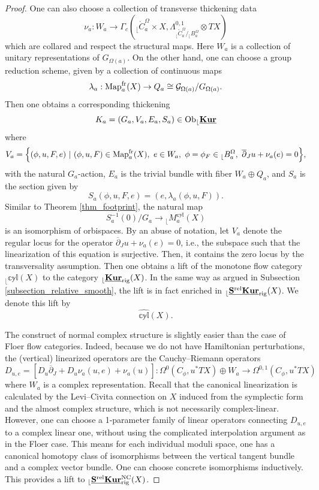 \documentclass[reqno, 10pt]{amsart}
\numberwithin{equation}{section}
\numberwithin{equation}{section}
\theoremstyle{definition}
\theoremstyle{remark}
\newcommand{\beqn}{\begin{equation*}}
\newcommand{\eeqn}{\end{equation*}}
\newcommand{\ov}{\overline}
\newcommand{\mb}{\mathbb}
\newcommand{\mc}{\mathcal}
\renewcommand{\outer}{{}_{\lfloor}}
\newcommand{\uds}[1]{\underline{\smash{#1}}}
\begin{document}
\begin{proof}
One can also choose a collection of transverse thickening data
\beqn
\nu_a: W_a \to \Gamma_c( \outer \mathring C_a^\Omega \times X, \Lambda_{\outer \mathring C_a^\Omega/ \outer B_a^\Omega}^{0,1}\otimes TX)
\eeqn
which are collared and respect the structural maps. Here $W_a$ is a collection of unitary representations of $G_{\Omega(a)}$. On the other hand, one can choose a group reduction scheme, given by a collection of continuous maps
\beqn
\lambda_a: {\rm Map}_a^{\rm fr}(X) \to Q_a\cong {\mc G}_{\Omega(a)}/ G_{\Omega(a)}.
\eeqn
Then one obtains a corresponding thickening
\beqn
K_a = (G_a, V_a, E_a, S_a) \in {\rm Ob} \outer \uds{\bf Kur}
\eeqn
where 
\beqn
V_a = \Big\{ (\phi, u, F, e)\ |\ (\phi, u, F) \in {\rm Map}_a^{\rm fr}(X),\ e \in W_a,\ \phi = \phi_F \in \outer B_a^\Omega,\ \ov\partial_J u + \nu_a (e) = 0    \Big\},
\eeqn
with the natural $G_a$-action, $E_a$ is the trivial bundle with fiber $W_a \oplus Q_a$, and $S_a$ is the section given by 
\beqn
S_a (\phi, u, F, e) = (e, \lambda_a (\phi, u, F)).
\eeqn
Similar to Theorem \ref{thm_footprint}, the natural map
\beqn
S_a^{-1}(0)/G_a \to \outer M_a^{\mb{cyl} } (X)
\eeqn
is an isomorphism of orbispaces. By an abuse of notation, let $V_a$ denote the regular locus for the operator $\ov\partial_J u + \nu_a (e)= 0$, i.e., the subspace such that the linearization of this equation is surjective. Then, it contains the zero locus by the transversality assumption. Then one obtains a lift of the monotone flow category $\outer \mb{cyl} (X)$ to the category $\outer \uds{\bf Kur}_{\rm rig}(X)$. In the same way as argued in Subsection \ref{subsection_relative_smooth}, the lift is in fact enriched in $\outer \uds{\bf S^{\rm rel}Kur}_{\rm rig}(X)$. We denote this lift by 
\beqn
\widehat{\mb{cyl}} (X).
\eeqn

The construct of normal complex structure is slightly easier than the case of Floer flow categories. Indeed, because we do not have Hamiltonian perturbations, the (vertical) linearized operators are the Cauchy--Riemann operators
\beqn
D_{u, e}= \left[ D_u\ov\partial_J + D_u \nu_a(u, e) + \nu_a(u) \right]: \Omega^0 (C_\phi, u^* TX) \oplus W_a \to \Omega^{0,1}(C_\phi, u^* TX)
\eeqn
where $W_a$ is a complex representation. Recall that the canonical linearization is calculated by the Levi--Civita connection on $X$ induced from the symplectic form and the almost complex structure, which is not necessarily complex-linear. However, one can choose a 1-parameter family of linear operators connecting $D_{u, e}$ to a complex linear one, without using the complicated interpolation argument as in the Floer case. This means for each individual moduli space, one has a canonical homotopy class of isomorphisms between the vertical tangent bundle and a complex vector bundle. One can choose concrete isomorphisms inductively. This provides a lift to $\outer \uds{\bf S^{\rm rel}Kur}_{\rm rig}^{\rm NC}(X)$.


\end{proof}
\end{document}
